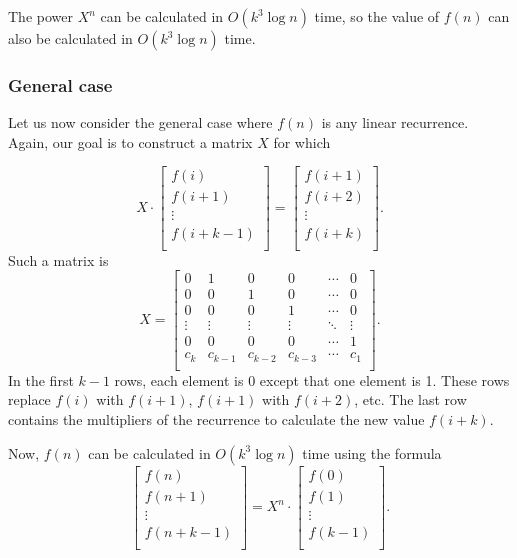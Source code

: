 The power $X^n$ can be calculated in
$O(k^3 \log n)$ time,
so the value of $f(n)$ can also be calculated
in $O(k^3 \log n)$ time.

\subsubsection{General case}

Let us now consider the general case where
$f(n)$ is any linear recurrence.
Again, our goal is to construct a matrix $X$
for which

\[ X \cdot
 \begin{bmatrix}
  f(i) \\
  f(i+1) \\
  \vdots \\
  f(i+k-1) \\
 \end{bmatrix}
=
 \begin{bmatrix}
  f(i+1) \\
  f(i+2) \\
  \vdots \\
  f(i+k) \\
 \end{bmatrix}.
\]
Such a matrix is
\[
X =
 \begin{bmatrix}
  0 & 1 & 0 & 0 & \cdots & 0 \\
  0 & 0 & 1 & 0 & \cdots & 0 \\
  0 & 0 & 0 & 1 & \cdots & 0 \\
  \vdots & \vdots & \vdots & \vdots & \ddots & \vdots \\
  0 & 0 & 0 & 0 & \cdots & 1 \\
  c_k & c_{k-1} & c_{k-2} & c_{k-3} & \cdots & c_1 \\
 \end{bmatrix}.
\]
In the first $k-1$ rows, each element is 0
except that one element is 1.
These rows replace $f(i)$ with $f(i+1)$,
$f(i+1)$ with $f(i+2)$, etc.
The last row contains the multipliers of the recurrence
to calculate the new value $f(i+k)$.

\begin{samepage}
Now, $f(n)$ can be calculated in
$O(k^3 \log n)$ time using the formula
\[
 \begin{bmatrix}
  f(n) \\
  f(n+1) \\
  \vdots \\
  f(n+k-1) \\
 \end{bmatrix}
=
X^n \cdot
 \begin{bmatrix}
  f(0) \\
  f(1) \\
  \vdots \\
  f(k-1) \\
 \end{bmatrix}.
\]
\end{samepage}

